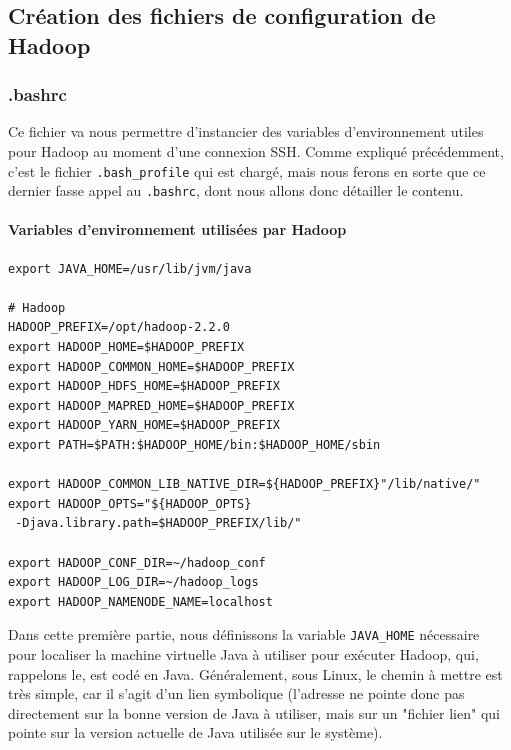\newpage

\subsection{Création des fichiers de configuration de Hadoop}
\label{sec:creat-des-fich}

\subsubsection{.bashrc}
\label{sec:.bashrc}

\par Ce fichier va nous permettre d'instancier des variables d'environnement utiles pour Hadoop au moment d'une connexion SSH. Comme expliqué précédemment, c'est le fichier \texttt{.bash\_profile} qui est chargé, mais nous ferons en sorte que ce dernier fasse appel au \texttt{.bashrc}, dont nous allons donc détailler le contenu.

\paragraph{Variables d'environnement utilisées par Hadoop}
\label{sec:vari-denv-util}

\begin{verbatim}
export JAVA_HOME=/usr/lib/jvm/java

# Hadoop
HADOOP_PREFIX=/opt/hadoop-2.2.0
export HADOOP_HOME=$HADOOP_PREFIX
export HADOOP_COMMON_HOME=$HADOOP_PREFIX
export HADOOP_HDFS_HOME=$HADOOP_PREFIX
export HADOOP_MAPRED_HOME=$HADOOP_PREFIX
export HADOOP_YARN_HOME=$HADOOP_PREFIX
export PATH=$PATH:$HADOOP_HOME/bin:$HADOOP_HOME/sbin

export HADOOP_COMMON_LIB_NATIVE_DIR=${HADOOP_PREFIX}"/lib/native/"
export HADOOP_OPTS="${HADOOP_OPTS}
 -Djava.library.path=$HADOOP_PREFIX/lib/"

export HADOOP_CONF_DIR=~/hadoop_conf
export HADOOP_LOG_DIR=~/hadoop_logs
export HADOOP_NAMENODE_NAME=localhost
\end{verbatim}

\par Dans cette première partie, nous définissons la variable \texttt{JAVA\_HOME} nécessaire pour localiser la machine virtuelle Java à utiliser pour exécuter Hadoop, qui, rappelons le, est codé en Java. Généralement, sous Linux, le chemin à mettre est très simple, car il s'agit d'un lien symbolique (l'adresse ne pointe donc pas directement sur la bonne version de Java à utiliser, mais sur un "fichier lien" qui pointe sur la version actuelle de Java utilisée sur le système).

